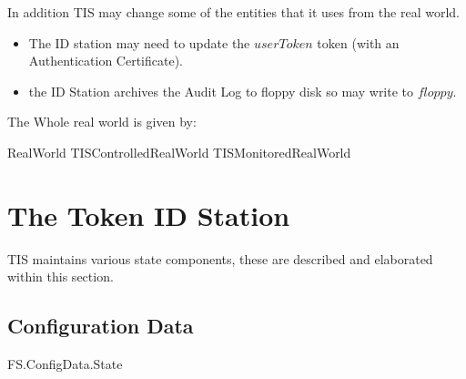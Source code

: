 In addition TIS may change some of the entities that it uses from the
real world.   
\begin{itemize}
\item The ID station may need to update the $userToken$ token
(with an Authentication Certificate).
\item the ID Station archives the Audit Log to floppy disk so may
write to $floppy$.
\end{itemize}


The Whole real world is given by:
\begin{zed}
RealWorld  TISControlledRealWorld \land TISMonitoredRealWorld
\end{zed}
\chapter{The Token ID Station}
\label{sec:TIS}
TIS maintains various state components, these are described and
elaborated within this section. 

\section{Configuration Data}

\begin{traceunit}{FS.ConfigData.State}
\end{traceunit}


